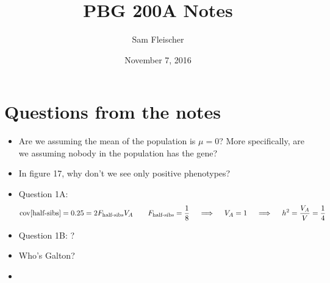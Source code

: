 \documentclass{article}
\title{PBG 200A Notes}
\author{Sam Fleischer}
\date{November 7, 2016}
\newcommand{\qiq}{\ \ \ \implies\ \ \ }
\newcommand{\cov}[1]{\text{cov}\qty[#1]}
\begin{document}
    \maketitle

    \section{Questions from the notes}
        \begin{itemize}
            \item Are we assuming the mean of the population is $\mu=0$?  More specifically, are we assuming nobody in the population has the gene?
            \item In figure 17, why don't we see only positive phenotypes?
            \item Question 1A:
            \begin{align*}
                \cov{\text{half-sibs}} = 0.25 = 2F_{\text{half-sibs}}V_A \qquad F_{\text{half-sibs}} = \frac{1}{8} \qiq V_A = 1 \qiq h^2 = \frac{V_A}{V} = \frac{1}{4}
            \end{align*}
            \item Question 1B: ?
            \item Who's Galton?
            \item 
        \end{itemize}
\end{document}
